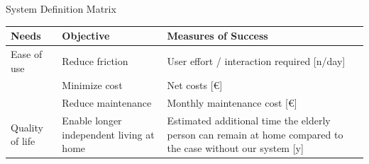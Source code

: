\begin{frame}{System Definition Matrix}

\centering

\renewcommand{\arraystretch}{1.5}

\begin{tabularx}{0.95\textwidth}{|
    >{\raggedright\arraybackslash}p{2.5cm}|
    >{\raggedright\arraybackslash}X|
    >{\raggedright\arraybackslash}X|
}
\hline

\textbf{Needs} &
\textbf{Objective} &
\textbf{Measures of Success} \\
\hline

Ease of use
&
Reduce friction
&
User effort / interaction required [n/day]
\\
\hline

\multirow{2}{*}{Affordability}
&
Minimize cost 
&
Net costs [€]
\\
\cline{2-3}
&
Reduce maintenance
&
Monthly maintenance cost [€]
\\
\hline

Quality of life
&
Enable longer independent living at home
&
Estimated additional time the elderly person can remain at home compared to the case without our system [y]
\\
\hline

\end{tabularx}

\end{frame}